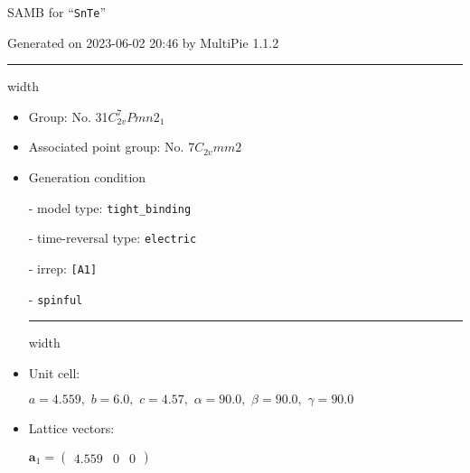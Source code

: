 \documentclass[fleqn,10pt,landscape]{article}
\begin{document}
\setcounter{MaxMatrixCols}{16}

\setlength{\baselineskip}{16pt}
\footnotesize
\begin{center}
\LARGE
SAMB for ``\texttt{SnTe}''
\end{center}
\begin{flushright}
Generated on 2023-06-02 20:46 by MultiPie 1.1.2
\end{flushright}
\vspace{1cm}


 \hfil \hrule height 1mm width \textwidth \hfil

\begin{itemize}
\item Group: No. 31\quad$C_{2v}^{7}$\quad$Pmn2_1$\quad[ orthorhombic ]

\item Associated point group: No. 7\quad$C_{2v}$\quad$mm2$\quad[ orthorhombic ]

\vspace{5mm}

\item Generation condition

\quad - model type: \texttt{tight_binding}

\quad - time-reversal type: \texttt{electric}

\quad - irrep: \texttt{[A1]}

\quad - \texttt{spinful}


 \hfil \hrule height 1mm width \textwidth \hfil

\item Unit cell:

\quad $a=4.559,\,\, b=6.0,\,\, c=4.57,\,\, \alpha=90.0,\,\, \beta=90.0,\,\, \gamma=90.0$

\item Lattice vectors:

\quad $\bm{a}_1=\begin{pmatrix} 4.559 & 0 & 0 \end{pmatrix}$


\end{itemize}
\end{document}
